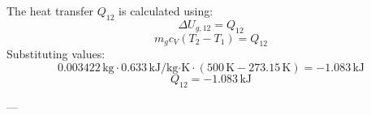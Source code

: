 The heat transfer \( Q_{12} \) is calculated using:  
\[
\Delta U_{g,12} = Q_{12}
\]  
\[
m_g c_V (T_2 - T_1) = Q_{12}
\]  
Substituting values:  
\[
0.003422 \, \text{kg} \cdot 0.633 \, \text{kJ/kg·K} \cdot (500 \, \text{K} - 273.15 \, \text{K}) = -1.083 \, \text{kJ}
\]  
\[
Q_{12} = -1.083 \, \text{kJ}
\]  

---